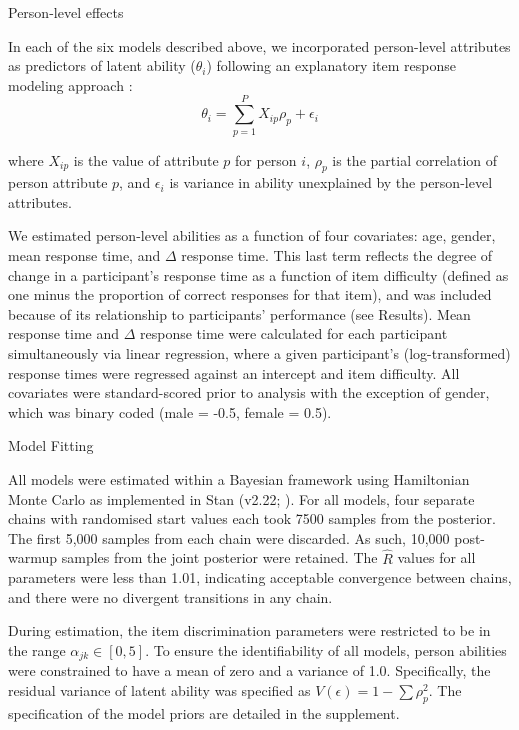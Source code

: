 \documentclass[a4paper,man,natbib]{apa6}
\makeatletter
\renewcommand{\subsubsection}{\@startsection{subsubsection}{3}
  {\z@}%
  {\b@level@two@skip}{\e@level@two@skip}%
  {\normalfont\normalsize\bfseries}}
\makeatother
\begin{document}
\subsubsection{Person-level effects}

In each of the six models described above, we incorporated person-level attributes as predictors of latent ability ($\theta_i$) following an explanatory item response modeling approach \citep{wilson2008explanatory}: 
\begin{equation} \label{eq:4}
\theta_i = \sum_{p=1}^P X_{ip} \rho_p + \epsilon_i    
\end{equation}

\noindent where $X_{ip}$ is the value of attribute $p$ for person $i$, $\rho_p$ is the partial correlation of person attribute $p$, and $\epsilon_i$ is variance in ability unexplained by the person-level attributes. 

We estimated person-level abilities as a function of four covariates: age, gender, mean response time, and $\Delta$ response time. This last term reflects the degree of change in a participant's response time as a function of item difficulty (defined as one minus the proportion of correct responses for that item), and was included because of its relationship to participants' performance (see Results). Mean response time and $\Delta$ response time were calculated for each participant simultaneously via linear regression, where a given participant's (log-transformed) response times were regressed against an intercept and item difficulty. All covariates were standard-scored prior to analysis with the exception of gender, which was binary coded (male = -0.5, female = 0.5).

\subsubsection{Model Fitting}

All models were estimated within a Bayesian framework using Hamiltonian Monte Carlo as implemented in Stan (v2.22; \citealt{carpenter2017stan}). For all models, four separate chains with randomised start values each took 7500 samples from the posterior. The first 5,000 samples from each chain were discarded. As such, 10,000 post-warmup samples from the joint posterior were retained. The $\hat{R}$ values for all parameters were less than 1.01, indicating acceptable convergence between chains, and there were no divergent transitions in any chain. 

During estimation, the item discrimination parameters were restricted to be in the range $\alpha_{jk} \in [0, 5]$. To ensure the identifiability of all models, person abilities were constrained to have a mean of zero and a variance of 1.0. Specifically, the residual variance of latent ability was specified as $V(\epsilon) = 1 - \sum \rho_p^2$. The specification of the model priors are detailed in the supplement.
\end{document}
